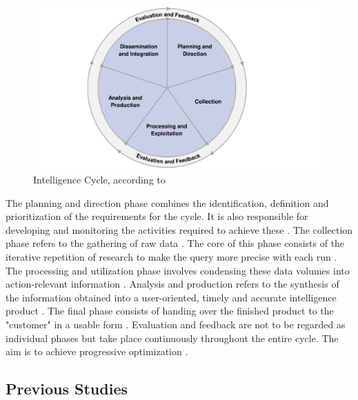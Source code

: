 \documentclass[10pt]{article}
\begin{document}
\begin{figure}[h]
    \centering
    \includegraphics[clip,width=0.9\linewidth]{PDF/images/crop_Intelligence Cycle}
    \caption{Intelligence Cycle, according to \cite{JointChiefsofStaffU.S.Army.2013}}
    \label{fig: intelligence cycle}
\end{figure}

The planning and direction phase combines the identification, definition and prioritization
of the requirements for the cycle. It is also responsible for developing and monitoring the activities
required to achieve these \cite{DepartmentoftheArmy.2012, JointChiefsofStaffU.S.Army.2013, DepartmentoftheArmy.2012}.
The collection phase refers to the gathering of raw data \cite{CentralIntelligenceAgency.1987}.
The core of this phase consists of the iterative repetition of research
\cite{NorthAtlanticTreatyOrganization.2001} to make the query more precise with each run
\cite{PastorGalindo.2020}. The processing and utilization phase involves condensing
these data volumes into action-relevant information
\cite{DirectorofNationalIntelligence.2011, JointChiefsofStaffU.S.Army.2013, PastorGalindo.2020}.
Analysis and production refers to the synthesis of the information obtained into a
user-oriented, timely and accurate intelligence product
\cite{DepartmentoftheArmy.2012, Hwang.2022, NorthAtlanticTreatyOrganization.2001}.
The final phase consists of handing over the finished product to the "customer" in a
usable form \cite{CentralIntelligenceAgency.2023, DepartmentoftheArmy.2012, Williams.2018}.
Evaluation and feedback are not to be regarded as individual phases
but take place continuously throughout the entire cycle. The aim is to achieve progressive optimization
\cite{DirectorofNationalIntelligence.2011, JointChiefsofStaffU.S.Army.2013, NorthAtlanticTreatyOrganization.2001}.

\subsection{Previous Studies}
\end{document}
